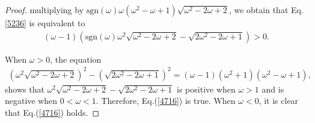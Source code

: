 \documentclass[10pt,a4paper]{amsart}
\begin{document}
\begin{proof}
multiplying by $\mathrm{sgn}(\omega) \omega(\omega^2 - \omega + 1)\sqrt{\omega^2-2\omega +2}$, we obtain that Eq.\eqref{5236} is equivalent to
\begin{align}
\label{4716}
(\omega-1)(\mathrm{sgn}(\omega)\omega^2 \sqrt{\omega^2-2\omega +2} -\sqrt{2\omega^2-2\omega+1})>0.
\end{align}

When $\omega > 0$, the equation
\begin{align*}
    \left(\omega^2 \sqrt{\omega^2 - 2\omega + 2}\right)^2 - \left(\sqrt{2\omega^2 - 2\omega + 1}\right)^2 =(\omega-1)(\omega^2+1)(\omega^2-\omega+1),
\end{align*}
shows that $\omega^2 \sqrt{\omega^2-2\omega +2} -\sqrt{2\omega^2-2\omega+1}$
is positive when $\omega>1$ and is negative when $0<\omega<1$.
Therefore, Eq.(\ref{4716}) is true.
When $\omega < 0$, it is clear that Eq.(\ref{4716}) holds.



\end{proof}
\end{document}
